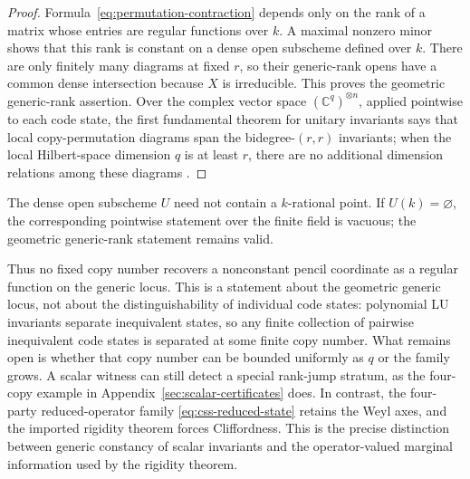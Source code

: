\begin{proof}
Formula~\eqref{eq:permutation-contraction} depends only on the rank of a
matrix whose entries are regular functions over \(k\).  A maximal nonzero
minor shows that this rank is constant on a dense open subscheme defined
over \(k\).  There are only finitely many diagrams at fixed \(r\), so
their generic-rank opens have a common dense intersection because \(X\)
is irreducible.  This proves the geometric generic-rank assertion.  Over the complex vector space
\((\mathbb C^q)^{\otimes n}\), applied pointwise to each code state, the
first fundamental theorem for unitary invariants says that local
copy-permutation diagrams span the bidegree-\((r,r)\) invariants; when the
local Hilbert-space dimension \(q\) is at least \(r\), there are no
additional dimension relations among these diagrams
\cite[Section~2]{CollinsSniady2006}.
\end{proof}

\begin{remark}
The dense open subscheme \(U\) need not contain a \(k\)-rational point.  If
\(U(k)=\varnothing\), the corresponding pointwise statement over the finite
field is vacuous; the geometric generic-rank statement remains valid.
\end{remark}

Thus no fixed copy number recovers a nonconstant pencil coordinate as a
regular function on the generic locus.  This is a statement about the
geometric generic locus, not about the distinguishability of individual
code states: polynomial LU invariants separate inequivalent states, so
any finite collection of pairwise inequivalent code states is separated at
some finite copy number.  What remains open is whether that copy number
can be bounded uniformly as \(q\) or the family grows.  A scalar witness
can still detect a special
rank-jump stratum, as the four-copy example in
Appendix~\ref{sec:scalar-certificates} does.  In contrast, the four-party
reduced-operator family \eqref{eq:css-reduced-state} retains the Weyl axes,
and the imported rigidity theorem forces Cliffordness.  This is the precise
distinction between generic constancy of scalar invariants and the
operator-valued marginal information used by the rigidity theorem.
